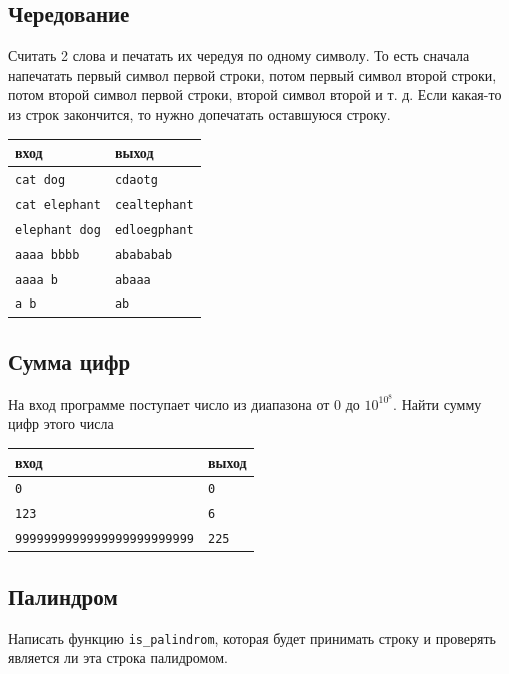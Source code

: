 \documentclass{article}
\begin{document}
\subsection{Чередование}
Считать 2 слова и печатать их чередуя по одному символу. То есть сначала напечатать первый символ первой строки, потом первый символ второй строки, потом второй символ первой строки, второй символ второй и т. д. Если какая-то из строк закончится, то нужно допечатать оставшуюся строку.
\begin{center}
\begin{tabular}{ l | l }
 вход & выход \\ \hline
 \texttt{cat dog} & \texttt{cdaotg}  \\ 
 \texttt{cat elephant} & \texttt{cealtephant} \\
 \texttt{elephant dog} & \texttt{edloegphant} \\
 \texttt{aaaa bbbb} & \texttt{abababab} \\
 \texttt{aaaa b} & \texttt{abaaa}\\ 
 \texttt{a b} & \texttt{ab}\\ 
\end{tabular}
\end{center}


\subsection{Сумма цифр}
На вход программе поступает число из диапазона от $0$ до $10^{10^8}$. Найти сумму цифр этого числа 
\begin{center}
\begin{tabular}{ l | l }
 вход & выход \\ \hline
 \texttt{0} & \texttt{0}  \\ 
 \texttt{123} & \texttt{6} \\
 \texttt{9999999999999999999999999} & \texttt{225} \\
\end{tabular}
\end{center}


\subsection{Палиндром}
Написать функцию \texttt{is\_palindrom}, которая будет принимать строку и проверять является ли эта строка палидромом.
\end{document}
